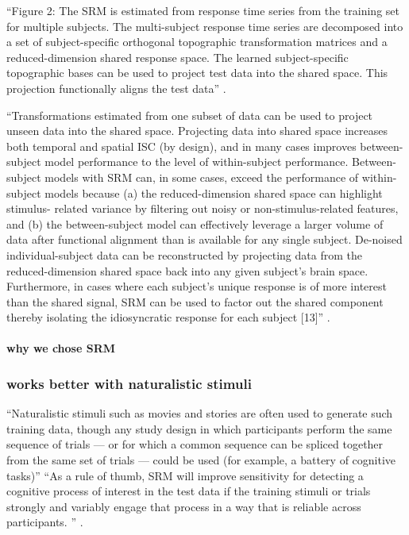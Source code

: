 %
``Figure 2: The SRM is estimated from response time series from the training set
for multiple subjects. The multi-subject response time series are decomposed
into a set of subject-specific orthogonal topographic transformation matrices
and a reduced-dimension shared response space. The learned subject-specific
topographic bases can be used to project test data into the shared space. This
projection functionally aligns the test data'' \citep{kumar2020brainiak}.

%
``Transformations estimated from one subset of data can be used to project
unseen data into the shared space. Projecting data into shared space increases
both temporal and spatial ISC (by design), and in many cases improves
between-subject model performance to the level of within-subject performance.
Between-subject models with SRM can, in some cases, exceed the performance of
within-subject models because (a) the reduced-dimension shared space can
highlight stimulus- related variance by filtering out noisy or
non-stimulus-related features, and (b) the between-subject model can effectively
leverage a larger volume of data after functional alignment than is available
for any single subject. De-noised individual-subject data can be reconstructed
by projecting data from the reduced-dimension shared space back into any given
subject’s brain space. Furthermore, in cases where each subject's unique
response is of more interest than the shared signal, SRM can be used to factor
out the shared component thereby isolating the idiosyncratic response for each
subject [13]'' \citep{kumar2020brainiak}.


\paragraph{why we chose SRM}





\subsubsection{works better with naturalistic stimuli}

``Naturalistic stimuli such as movies and stories are often used to generate
such training data, though any study design in which participants perform the
same sequence of trials --- or for which a common sequence can be spliced
together from the same set of trials --- could be used (for example, a battery
of cognitive tasks)'' \citep{cohen2017computational}
%
``As a rule of thumb, SRM will improve sensitivity for detecting a cognitive
process of interest in the test data if the training stimuli or trials strongly
and variably engage that process in a way that is reliable across participants.
'' \citep{cohen2017computational}.

